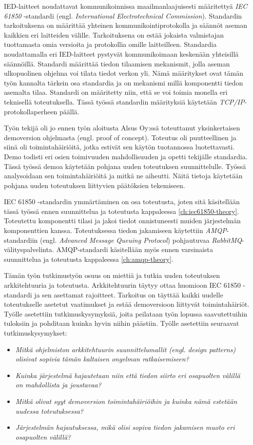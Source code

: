 IED-laitteet noudattavat kommunikoinnissa maailmanlaajuisesti määritettyä \emph{IEC 61850} -standardi (engl. \emph{International Electrotechnical Commission}). Standardin tarkoituksena on määrittää yhteinen kommunikointiprotokolla ja säännöt aseman kaikkien eri laitteiden välille. Tarkoituksena on estää jokaista valmistajan tuottamasta omia versioita ja protokollia omille laitteilleen. Standardia noudattamalla eri IED-laitteet pystyvät kommunikoimaan keskenään yhteisillä säännöillä. Standardi määrittää tiedon tilaamisen mekanismit, jolla aseman ulkopuolinen ohjelma voi tilata tiedot verkon yli. Nämä määritykset ovat tämän työn kannalta tärkein osa standardia ja on mekanismi millä komponentti tiedon asemalta tilaa. Standardi on määritetty niin, että se voi toimia monella eri teknisellä toteutuksella. Tässä työssä standardin määrityksiä käytetään \emph{TCP/IP}-protokollaperheen päällä.

Työn tekijä oli jo ennen työn aloitusta Alsus Oy:ssä toteuttanut yksinkertaisen demoversion ohjelmasta (engl. proof of concept). Toteutus oli puutteellinen ja siinä oli toimintahäiriöitä, jotka estivät sen käytön tuotannossa luotettavasti. Demo todisti eri osien toimivuuden mahdollisuuden ja opetti tekijälle standardia. Tässä työssä demoa käytetään pohjana uuden toteutuksen suunnittelulle. Työssä analysoidaan sen toimintahäiriöitä ja mitkä ne aiheutti. Näitä tietoja käytetään pohjana uuden toteutuksen liittyvien päätöksien tekemiseen.

IEC 61850 -standardin ymmärtäminen on osa toteutusta, joten sitä käsitellään tässä työssä ennen suunnittelua ja toteutusta kappaleessa \ref{ch:iec61850-theory}. Toteutettu komponentti tilasi ja jakoi tiedot onnistuneesti muiden järjestelmän komponenttien kanssa. Toteutuksessa tiedon jakamiseen käytettiin \emph{AMQP}-standardiin (engl. \emph{Advanced Message Queuing Protocol}) pohjautuvaa \emph{RabbitMQ}-välityspalvelinta. AMQP-standardi käsitellään myös ennen varsinaista suunnittelua ja toteutusta kappaleessa \ref{ch:amqp-theory}.

Tämän työn tutkimustyön osuus on miettiä ja tutkia uuden toteutuksen arkkitehtuuria ja toteutusta. Arkkitehtuurin täytyy ottaa huomioon IEC 61850 -standardi ja sen asettamat rajoitteet. Tarkoitus on täyttää kaikki uudelle toteutukselle asetetut vaatimukset ja estää demoversioon liittyvät toimintahäiriöt. Työlle asetettiin tutkimuskysymyksiä, joita peilataan työn lopussa saavutettuihin tuloksiin ja pohditaan kuinka hyvin niihin päästiin. Työlle asetettiin seuraavat tutkimuskysymykset:
\begin{itemize}
	\item \emph{Mitkä ohjelmiston arkkitehtuurin suunnittelumallit (engl. design patterns) olisivat sopivia tämän kaltaisen ongelman ratkaisemiseen?}
	\item \emph{Kuinka järjestelmä hajautetaan niin että tiedon siirto eri osapuolten välillä on mahdollista ja joustavaa?}
	\item \emph{Mitkä olivat syyt demoversion toimintahäiriöihin ja kuinka nämä estetään uudessa toteutuksessa?}
	\item \emph{Järjestelmän hajautuksessa, mikä olisi sopiva tiedon jakamisen muoto eri osapuolten välillä?}
\end{itemize}